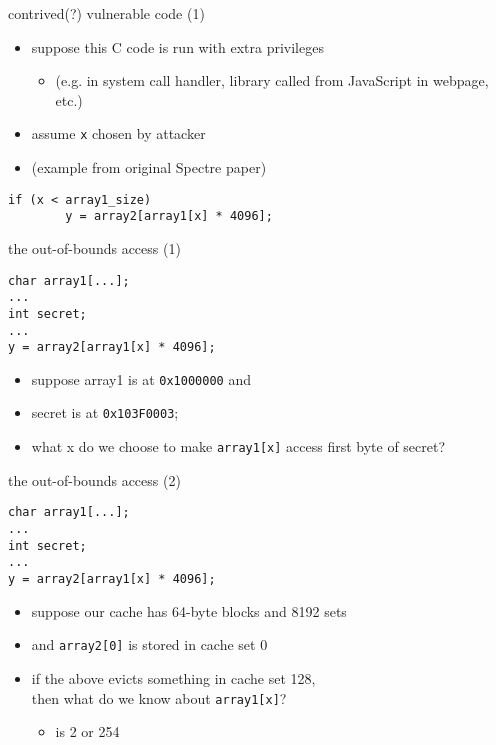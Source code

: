 \begin{frame}[fragile]{contrived(?) vulnerable code (1)}
\begin{itemize}
\item suppose this C code is run with extra privileges
    \begin{itemize}
    \item (e.g. in system call handler, library called from JavaScript in webpage, etc.)
    \end{itemize}
\item assume \texttt{x} chosen by attacker
\item (example from original Spectre paper)
\end{itemize}
\begin{lstlisting}
if (x < array1_size)
        y = array2[array1[x] * 4096];
\end{lstlisting}
\end{frame}

\begin{frame}[fragile]{the out-of-bounds access (1)}
\begin{lstlisting}
char array1[...];
...
int secret;
...
y = array2[array1[x] * 4096];
\end{lstlisting}
\begin{itemize}
\item suppose array1 is at \texttt{0x1000000} and
\item secret is at \texttt{0x103F0003};
\item what x do we choose to make \lstinline|array1[x]| access first byte of secret?
\end{itemize}
\end{frame}

\begin{frame}[fragile]{the out-of-bounds access (2)}
\begin{lstlisting}
char array1[...];
...
int secret;
...
y = array2[array1[x] * 4096];
\end{lstlisting}
\begin{itemize}
\item suppose our cache has 64-byte blocks and 8192 sets
\item and \lstinline|array2[0]| is stored in cache set 0
\vspace{.5cm}
\item if the above evicts something in cache set 128, \\
      then what do we know about \texttt{array1[x]}?
    \begin{itemize}
    \item<2-> is 2 or 254
    \end{itemize}
\end{itemize}
\end{frame}

